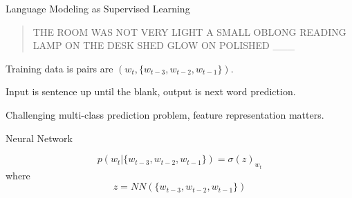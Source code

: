 \documentclass{beamer}
\let\tempone\itemize
\let\temptwo\enditemize
\renewenvironment{itemize}{\tempone\addtolength{\itemsep}{0.5\baselineskip}}{\temptwo}
\begin{document}
\begin{frame}{Language Modeling as Supervised Learning}
  \begin{quote}
    THE ROOM WAS NOT VERY LIGHT A SMALL OBLONG READING LAMP ON THE
    DESK SHED GLOW ON POLISHED \_\_\_\
  \end{quote}


  \begin{itemize}
  \item Training data is pairs are $(w_t, \{w_{t-3}, w_{t-2}, w_{t-1}\})$.

  \item Input is sentence up until the blank, output is next word
    prediction.
  \item Challenging multi-class prediction problem, feature representation matters.

    \pause
    Neural Network 

    \[ p(w_t | \{w_{t-3}, w_{t-2}, w_{t-1}\} ) = \sigma(z)_{w_t} \]
    where 
    \[z = NN(\{w_{t-3}, w_{t-2}, w_{t-1}\}) \]
  \end{itemize}
\end{frame}
\end{document}
